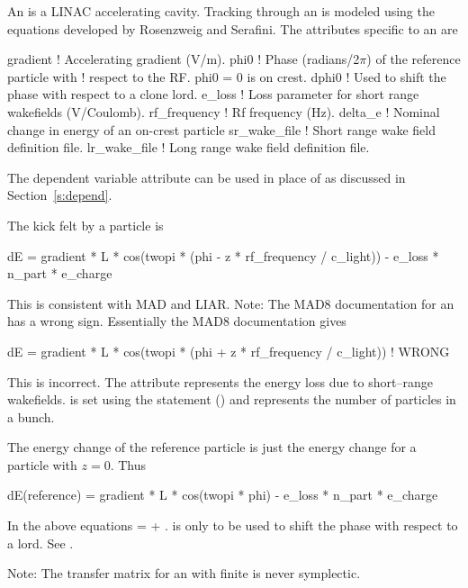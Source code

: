{{An  is a LINAC accelerating cavity.
Tracking through an  is modeled using the equations
developed by Rosenzweig and Serafini\cite{b:rosenzweig}. The
attributes specific to an  are 
\begin{example}
  gradient     ! Accelerating gradient (V/m).
  phi0         ! Phase (radians/2\(\pi\)) of the reference particle with 
               !   respect to the RF. phi0 = 0 is on crest.
  dphi0        ! Used to shift the phase with respect to a clone lord.
  e_loss       ! Loss parameter for short range wakefields (V/Coulomb).
  rf_frequency ! Rf frequency (Hz).
  delta_e      ! Nominal change in energy of an on-crest particle
  sr_wake_file ! Short range wake field definition file.
  lr_wake_file ! Long range wake field definition file.
\end{example}
The dependent variable  attribute can be used in place of
 as discussed in Section~\ref{s:depend}.

The kick felt by a particle is 
\begin{example}
  dE = gradient * L * cos(twopi * (phi - z * rf_frequency / c_light)) - 
                                                   e_loss * n_part * e_charge 
\end{example}
This is consistent with MAD and LIAR. Note: The MAD8 documentation 
for an  has a wrong sign. Essentially the MAD8 documentation gives
\begin{example}
  dE = gradient * L * cos(twopi * (phi + z * rf_frequency / c_light)) ! WRONG
\end{example}
This is incorrect. The  attribute represents the energy loss due to 
short--range wakefields.  is set using the  statement 
() and represents the number of particles in a bunch. 

The energy change of the reference particle is just the energy change for a 
particle with $z = 0$. Thus
\begin{example}
  dE(reference) = gradient * L * cos(twopi * phi) - e_loss * n_part * e_charge
\end{example}

In the above equations  =  + . 
is only to be used to shift the phase with respect to a 
lord. See .

Note: The transfer matrix for an  with finite
 is never symplectic.

}}
